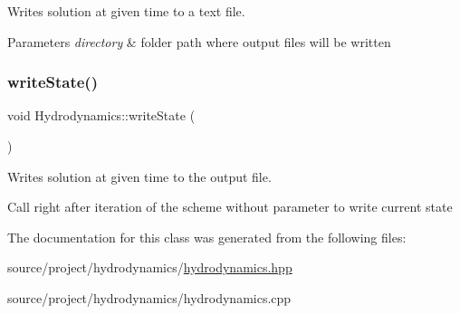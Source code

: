 Writes solution at given time to a text file. 


\begin{DoxyParams}{Parameters}
{\em directory} & folder path where output files will be written \\
\hline
\end{DoxyParams}
\mbox{\label{classHydrodynamics_ab281cb2f11cc03bfdc87f52876ca2f8b}} 
\subsubsection{\texorpdfstring{write\+State()}{writeState()}\hspace{0.1cm}{\footnotesize\ttfamily [2/2]}}
{\footnotesize\ttfamily void Hydrodynamics\+::write\+State (\begin{DoxyParamCaption}{ }\end{DoxyParamCaption})}



Writes solution at given time to the output file. 

Call right after iteration of the scheme without parameter to write current state 

The documentation for this class was generated from the following files\+:\begin{DoxyCompactItemize}
\item 
source/project/hydrodynamics/\hyperlink{hydrodynamics_8hpp}{hydrodynamics.\+hpp}\item 
source/project/hydrodynamics/hydrodynamics.\+cpp\end{DoxyCompactItemize}
